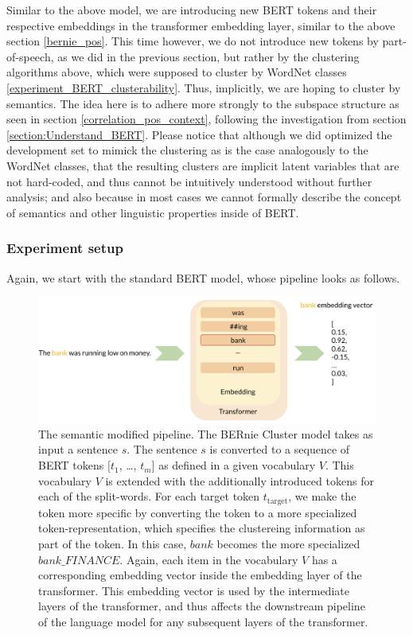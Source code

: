 \documentclass[a4paper,12pt,twoside,openright]{report}
\begin{document}
Similar to the above model, we are introducing new BERT tokens and their respective embeddings in the transformer embedding layer, similar to the above section \ref{bernie_pos}.
This time however, we do not introduce new tokens by part-of-speech, as we did in the previous section, but rather by the clustering algorithms above, which were supposed to cluster by WordNet classes \ref{experiment_BERT_clusterability}.
Thus, implicitly, we are hoping to cluster by semantics.
The idea here is to adhere more strongly to the subspace structure as seen in section \ref{correlation_pos_context}, following the investigation from section \ref{section:Understand_BERT}.
Please notice that although we did optimized the development set to mimick the clustering as is the case analogously to the WordNet classes, that the resulting clusters are implicit latent variables that are not hard-coded, and thus cannot be intuitively understood without further analysis; and also because in most cases we cannot formally describe the concept of semantics and other linguistic properties inside of BERT.

\subsubsection{Experiment setup}

Again, we start with the standard BERT model, whose pipeline looks as follows.

\begin{figure}[H]
	\center
  \includegraphics[width=\linewidth]{./assets/experiments/pipeline_tokenizer_BERnie_meaning_.png}
  \caption{
  The semantic modified pipeline. 
  The BERnie Cluster model takes as input a sentence $s$. The sentence $s$ is converted to a sequence of BERT tokens $[t_1$, \ldots, $t_m]$ as defined in a given vocabulary $V$.
  This vocabulary $V$ is extended with the additionally introduced tokens for each of the split-words.
For each target token $t_{\text{target}}$, we make the token more specific by converting the token to a more specialized token-representation, which specifies the clustereing information as part of the token.
In this case, $bank$ becomes the more specialized $bank\_FINANCE$.
Again, each item in the vocabulary $V$ has a corresponding embedding vector inside the embedding layer of the transformer.
This embedding vector is used by the intermediate layers of the transformer, and thus affects the downstream pipeline of the language model for any subsequent layers of the transformer.
  }
  \label{fig:BERT_semantic_modified_pipeline}
\end{figure}
\end{document}
